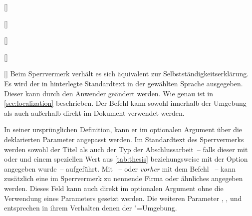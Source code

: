 \begin{Declaration}{}
\begin{Declaration}{[]}
\begin{Declaration}{[]}
\begin{Declaration}[v2.02]{%
  []%
}
\begin{Declaration}[v2.02]{%
  []%
}
\begin{Declaration}{[\PSet]}
\printdeclarationlist%
%
%
Beim Sperrvermerk verhält es sich äquivalent zur Selbstständigkeitserklärung.
Es wird der in  hinterlegte Standardtext in der gewählten 
Sprache ausgegeben. Dieser kann durch den Anwender geändert werden. Wie genau 
ist in \autoref{sec:localization} beschrieben. Der Befehl  
kann sowohl innerhalb der Umgebung  als auch 
außerhalb direkt im Dokument verwendet werden. 

In seiner ursprünglichen Definition, kann er im optionalen Argument über die 
deklarierten Parameter angepasst werden. Im Standardtext des Sperrvermerks 
werden sowohl der Titel als auch der Typ der Abschlussarbeit~-- falls dieser 
mit  oder  und einem speziellen Wert aus 
\autoref{tab:thesis} beziehungsweise mit der Option  
angegeben wurde~-- aufgeführt. Mit ~-- oder 
\emph{vorher} mit dem Befehl ~-- kann zusätzlich eine im 
Sperrvermerk zu nennende Firma oder ähnliches angegeben werden. Dieses Feld 
kann auch direkt im optionalen Argument ohne die Verwendung eines Parameters 
gesetzt werden. Die weiteren Parameter 
, 
, 
 und 
 entsprechen in ihrem Verhalten denen 
der "=Umgebung.
\end{Declaration}
\end{Declaration}
\end{Declaration}
\end{Declaration}
\end{Declaration}
\end{Declaration}

